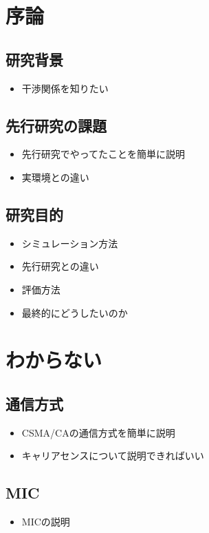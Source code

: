\chapter{序論}
\section{研究背景}
\begin{itemize}
  \item 干渉関係を知りたい
\end{itemize}

\section{先行研究の課題}
\begin{itemize}
  \item 先行研究でやってたことを簡単に説明
  \item 実環境との違い
\end{itemize}

\section{研究目的}
\begin{itemize}
  \item シミュレーション方法
  \item 先行研究との違い
  \item 評価方法
  \item 最終的にどうしたいのか
\end{itemize}

\chapter{わからない}
\section{通信方式}
\begin{itemize}
  \item CSMA/CAの通信方式を簡単に説明
  \item キャリアセンスについて説明できればいい
\end{itemize}

\section{MIC}
\begin{itemize}
  \item MICの説明
\end{itemize}


